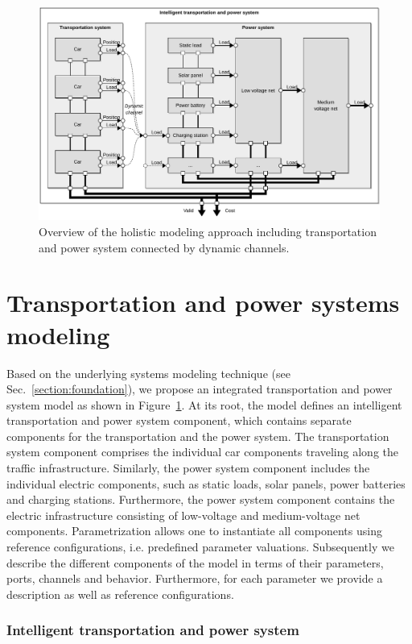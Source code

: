 \begin{figure}[b]
	\centering
	\includegraphics[width=\textwidth]{../gfx/model.pdf}
	\caption{Overview of the holistic modeling approach including transportation and power system connected by dynamic channels.}
	\label{fig:model}
\end{figure}

\section{Transportation and power systems modeling}
\label{section:contribution}

Based on the underlying systems modeling technique (see Sec.~\ref{section:foundation}), we propose an integrated transportation and power system model as shown in Figure~\ref{fig:model}. At its root, the model defines an intelligent transportation and power system component, which contains separate components for the transportation and the power system. The transportation system component comprises the individual car components traveling along the traffic infrastructure. Similarly, the power system component includes the individual electric components, such as static loads, solar panels, power batteries and charging stations. Furthermore, the power system component contains the electric infrastructure consisting of low-voltage and medium-voltage net components. Parametrization allows one to instantiate all components using reference configurations, i.e. predefined parameter valuations. Subsequently we describe the different components of the model in terms of their parameters, ports, channels and behavior. Furthermore, for each parameter we provide a description as well as reference configurations.

\subsubsection*{Intelligent transportation and power system}
\label{section:intelligent_system}


